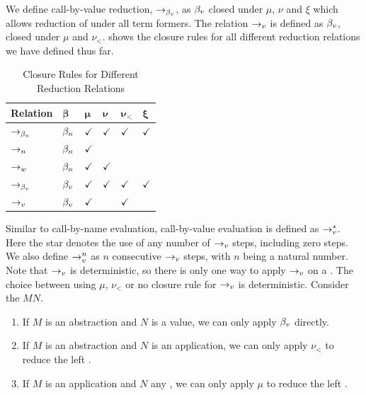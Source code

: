 We define call-by-value reduction, $\to_{\beta_v}$, as $\beta_v$ closed under $\mu$, $\nu$ and $\xi$ which allows reduction of \lterms under all term formers. 
The relation $\to_v$ is defined as $\beta_v$, closed under $\mu$ and $\nu_<$. 
 shows the closure rules for all different reduction relations we have defined thus far.

\begin{table}[htbp]
  \centering
  \begin{tabularx}{\linewidth}{|X|XXXXX|}
    \hline
    \textbf{Relation} & $\boldsymbol{\beta}$ & $\boldsymbol{\mu}$ & $\boldsymbol{\nu}$ & $\boldsymbol{\nu_<}$ & $\boldsymbol{\xi}$ \\
    \hline
    $\to_{\beta_n}$ & $\beta_n$ & $\checkmark$ & $\checkmark$ & $\checkmark$ & $\checkmark$ \\
    \hline
    $\to_n$  & $\beta_n$ & $\checkmark$ &              &  & \\
    \hline
    $\to_w$  & $\beta_n$ & $\checkmark$ & $\checkmark$ & & \\
    \hline
    $\to_{\beta_v}$ & $\beta_v$ & $\checkmark$ & $\checkmark$ & $\checkmark$ & $\checkmark$ \\
    \hline
    $\to_v$  & $\beta_v$ & $\checkmark$ &              & $\checkmark$ & \\
    \hline
  \end{tabularx}
  \caption{Closure Rules for Different Reduction Relations}
  \label{tab2:closure-rules}
\end{table}

Similar to call-by-name evaluation, call-by-value evaluation is defined as $\to_v^*$. 
Here the star denotes the use of any number of $\to_v$ steps, including zero steps.
We also define $\to_v^n$ as $n$ consecutive $\to_v$ steps, with $n$ being a natural number.
Note that $\to_v$ is deterministic, so there is only one way to apply $\to_v$ on a \lterm.
The choice between using $\mu$, $\nu_<$ or no closure rule for $\to_v$ is deterministic. Consider the \lterm $M N$.

\begin{enumerate}
  \item If $M$ is an abstraction and $N$ is a value, we can only apply $\beta_v$ directly.
  \item If $M$ is an abstraction and $N$ is an application, we can only apply $\nu_<$ to reduce the left \lterm.
  \item If $M$ is an application and $N$ any \lterm, we can only apply $\mu$ to reduce the left \lterm.
\end{enumerate}

